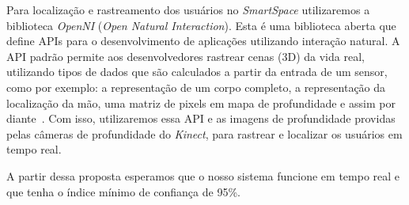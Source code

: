	Para localização e rastreamento dos usuários no \textit{SmartSpace} utilizaremos a biblioteca \textit{OpenNI} (\textit{Open Natural Interaction}). Esta é uma biblioteca aberta que define APIs para o desenvolvimento de aplicações utilizando interação natural. A API padrão permite aos desenvolvedores rastrear cenas (3D) da vida real, utilizando tipos de dados que são calculados a partir da entrada de um sensor, como por exemplo: a representação de um corpo completo, a representação da localização da mão, uma matriz de pixels em mapa de profundidade e assim por diante~\cite{openni}. Com isso, utilizaremos essa API e as imagens de profundidade providas pelas câmeras de profundidade do \textit{Kinect}, para rastrear e localizar os usuários em tempo real.

	A partir dessa proposta esperamos que o nosso sistema funcione em tempo real e que tenha o índice mínimo de confiança de 95\%. 